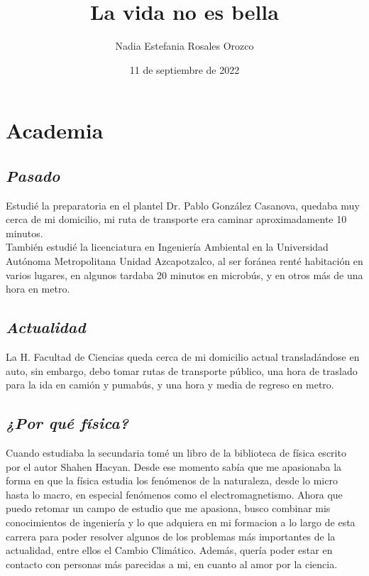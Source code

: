 \documentclass[letterpaper,12pt]{article}
\title{La vida no es bella}
\author{Nadia Estefania Rosales Orozco }
\date{11 de septiembre de 2022}
\begin{document}
\maketitle

\section{\Huge{Academia}}

    \subsection{\textit{\Large{Pasado}}}
    \small{Estudié la preparatoria en el plantel Dr. Pablo González Casanova, quedaba muy cerca de mi domicilio, mi ruta de transporte era caminar aproximadamente 10 minutos.}\\
    \small{También estudié la licenciatura en Ingeniería Ambiental en la Universidad Autónoma Metropolitana Unidad Azcapotzalco, al ser foránea renté habitación en varios lugares, en algunos tardaba 20 minutos en microbús, y en otros más de una hora en metro.}
    
    \subsection{\textit{\Large{Actualidad}}}
    \small{La H. Facultad de Ciencias queda cerca de mi domicilio actual transladándose en auto, sin embargo, debo tomar rutas de transporte público, una hora de traslado para la ida en camión y pumabús, y una hora y media de regreso en metro.}
    
    \subsection{\textit{\Large{¿Por qué física?}}}
    \small{Cuando estudiaba la secundaria tomé un libro de la biblioteca de física escrito por el autor Shahen Hacyan. Desde ese momento sabía que me apasionaba la forma en que la física estudia los fenómenos de la naturaleza, desde lo micro hasta lo macro, en especial fenómenos como el electromagnetismo. Ahora que puedo retomar un campo de estudio que me apasiona, busco combinar mis conocimientos de ingeniería y lo que adquiera en mi formacion a lo largo de esta carrera para poder resolver algunos de los problemas más importantes de la actualidad, entre ellos el Cambio Climático. Además, quería poder estar en contacto con personas más parecidas a mi, en cuanto al amor por la ciencia.}
\end{document}
